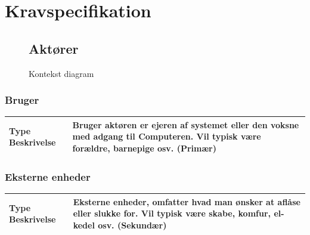 \chapter{Kravspecifikation}

\begin{figure}[htbp] \centering
\section{Aktører}
\caption{Kontekst diagram}
\label{lab:kontekstdiagram}
\end{figure}

\begin{table}[!htbp] \centering
\subsection{Bruger}
\begin{tabular}{|p{4cm}|p{8cm}|}
	\hline
		\textbf{Type Beskrivelse} &
			Bruger aktøren er ejeren af systemet eller den voksne med adgang til Computeren. 
			Vil typisk være forældre, barnepige osv. (Primær) \\\hline
	\end{tabular}
\end{table}

\begin{table}[!htbp] \centering
\subsection{Eksterne enheder}
\begin{tabular}{|p{4cm}|p{8cm}|}
	\hline
		\textbf{Type Beskrivelse} &
			Eksterne enheder, omfatter hvad man ønsker at aflåse eller slukke for. 
			Vil typisk være skabe, komfur, el-kedel osv. (Sekundær) \\\hline
	\end{tabular}
\end{table}

